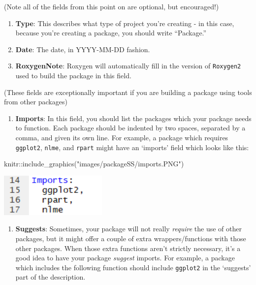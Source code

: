 \documentclass[
]{book}
\newenvironment{Shaded}{\begin{snugshade}}{\end{snugshade}}
\newcommand{\FunctionTok}[1]{\textcolor[rgb]{0.00,0.00,0.00}{#1}}
\newcommand{\NormalTok}[1]{#1}
\newcommand{\SpecialCharTok}[1]{\textcolor[rgb]{0.00,0.00,0.00}{#1}}
\newcommand{\StringTok}[1]{\textcolor[rgb]{0.31,0.60,0.02}{#1}}
\providecommand{\tightlist}{%
  \setlength{\itemsep}{0pt}\setlength{\parskip}{0pt}}
\begin{document}
(Note all of the fields from this point on are optional, but encouraged!)

\begin{enumerate}
\def\labelenumi{\arabic{enumi}.}
\setcounter{enumi}{8}
\tightlist
\item
  \textbf{Type}: This describes what type of project you're creating - in this case, because you're creating a package, you should write ``Package.''
\item
  \textbf{Date}: The date, in YYYY-MM-DD fashion.
\item
  \textbf{RoxygenNote}: Roxygen will automatically fill in the version of \texttt{Roxygen2} used to build the package in this field.
\end{enumerate}

(These fields are exceptionally important if you are building a package using tools from other packages)

\begin{enumerate}
\def\labelenumi{\arabic{enumi}.}
\setcounter{enumi}{11}
\tightlist
\item
  \textbf{Imports}: In this field, you should list the packages which your package needs to function. Each package should be indented by two spaces, separated by a comma, and given its own line. For example, a package which requires \texttt{ggplot2}, \texttt{nlme}, and \texttt{rpart} might have an `imports' field which looks like this:
\end{enumerate}

\begin{Shaded}
\begin{Highlighting}[]
\NormalTok{knitr}\SpecialCharTok{::}\FunctionTok{include\_graphics}\NormalTok{(}\StringTok{"images/packageSS/imports.PNG"}\NormalTok{)}
\end{Highlighting}
\end{Shaded}

\includegraphics[width=2.07in]{images/packageSS/imports}

\begin{enumerate}
\def\labelenumi{\arabic{enumi}.}
\setcounter{enumi}{12}
\tightlist
\item
  \textbf{Suggests}: Sometimes, your package will not really \emph{require} the use of other packages, but it might offer a couple of extra wrappers/functions with those other packages. When those extra functions aren't strictly necessary, it's a good idea to have your package \emph{suggest} imports. For example, a package which includes the following function should include \texttt{ggplot2} in the `suggests' part of the description.
\end{enumerate}
\end{document}
